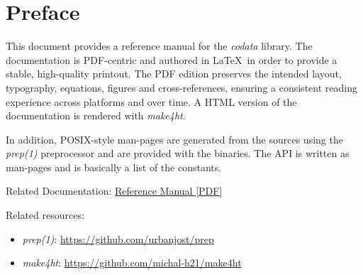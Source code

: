 \chapter{Preface}
This document provides a reference manual for the \emph{codata} library.
The documentation is PDF-centric and authored in \LaTeX\ in order to provide 
a stable, high-quality printout.
The PDF edition preserves the intended layout, typography, equations, figures
and cross-references, ensuring a consistent reading experience across 
platforms and over time.
A HTML version of the documentation is rendered with \emph{make4ht}.

In addition, POSIX-style man-pages are generated from the sources using 
the \emph{prep(1)} preprocessor and are provided with the binaries. 
The API is written as man-pages and is basically a list of the constants.


\vspace{1cm}

\ifdefined\HCode
\noindent Related Documentation: \href{./latex/codata-refman.pdf}{Reference Manual [PDF]}
\fi

\noindent Related resources:
\begin{itemize}
\item \emph{prep(1)}:   \url{https://github.com/urbanjost/prep}
\item \emph{make4ht}:   \url{https://github.com/michal-h21/make4ht}
\end{itemize}
